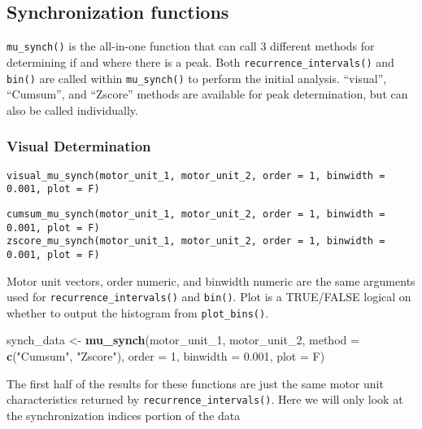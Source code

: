 \documentclass[]{article}
\newenvironment{Shaded}{\begin{snugshade}}{\end{snugshade}}
\newcommand{\KeywordTok}[1]{\textcolor[rgb]{0.13,0.29,0.53}{\textbf{#1}}}
\newcommand{\DataTypeTok}[1]{\textcolor[rgb]{0.13,0.29,0.53}{#1}}
\newcommand{\DecValTok}[1]{\textcolor[rgb]{0.00,0.00,0.81}{#1}}
\newcommand{\FloatTok}[1]{\textcolor[rgb]{0.00,0.00,0.81}{#1}}
\newcommand{\StringTok}[1]{\textcolor[rgb]{0.31,0.60,0.02}{#1}}
\newcommand{\NormalTok}[1]{#1}
\begin{document}
\subsection{Synchronization functions}\label{synchronization-functions}

\texttt{mu\_synch()} is the all-in-one function that can call 3
different methods for determining if and where there is a peak. Both
\texttt{recurrence\_intervals()} and \texttt{bin()} are called within
\texttt{mu\_synch()} to perform the initial analysis. ``visual'',
``Cumsum'', and ``Zscore'' methods are available for peak determination,
but can also be called individually.

\subsubsection{Visual Determination}\label{visual-determination}

\begin{verbatim}
visual_mu_synch(motor_unit_1, motor_unit_2, order = 1, binwidth = 0.001, plot = F)
\end{verbatim}

\begin{verbatim}
cumsum_mu_synch(motor_unit_1, motor_unit_2, order = 1, binwidth = 0.001, plot = F)
zscore_mu_synch(motor_unit_1, motor_unit_2, order = 1, binwidth = 0.001, plot = F)
\end{verbatim}

Motor unit vectors, order numeric, and binwidth numeric are the same
arguments used for \texttt{recurrence\_intervals()} and \texttt{bin()}.
Plot is a TRUE/FALSE logical on whether to output the histogram from
\texttt{plot\_bins()}.

\begin{Shaded}
\begin{Highlighting}[]
\NormalTok{synch_data <-}\StringTok{ }\KeywordTok{mu_synch}\NormalTok{(motor_unit_}\DecValTok{1}\NormalTok{, motor_unit_}\DecValTok{2}\NormalTok{, }\DataTypeTok{method =} \KeywordTok{c}\NormalTok{(}\StringTok{"Cumsum"}\NormalTok{, }\StringTok{"Zscore"}\NormalTok{), }\DataTypeTok{order =} \DecValTok{1}\NormalTok{, }\DataTypeTok{binwidth =} \FloatTok{0.001}\NormalTok{, }\DataTypeTok{plot =}\NormalTok{ F)}
\end{Highlighting}
\end{Shaded}

The first half of the results for these functions are just the same
motor unit characteristics returned by \texttt{recurrence\_intervals()}.
Here we will only look at the synchronization indices portion of the
data
\end{document}

